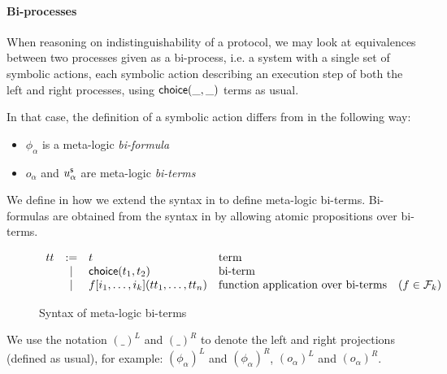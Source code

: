 \paragraph{Bi-processes}

When reasoning on indistinguishability of a protocol, we may look at equivalences
between two processes given as a bi-process, i.e. a system with a single set of
symbolic actions, each symbolic action describing an execution step of both the
left and right processes, using $\mathsf{choice}(\_,\_)$ terms as usual.

In that case, the definition of a symbolic action differs from 
in the following way:
\begin{itemize}
  \item $\phi_{\alpha}$ is a meta-logic \emph{bi-formula}
  \item $o_{\alpha}$ and $u_{\alpha}^{\textsf{s}}$ are meta-logic \emph{bi-terms}
\end{itemize}

We define in  how we extend the syntax in 
to define meta-logic bi-terms.
Bi-formulas are obtained from the syntax in  by allowing
atomic propositions over bi-terms.

\begin{figure}[h]
  \[
  \begin{array}{rclll}
    tt  & := & t &\text{term} & \\
        & \mid & \mathsf{choice}(t_1,t_2) &\text{bi-term} & \\
        & \mid & f[i_1,\ldots,i_k](tt_1,\dots,tt_n) &\text{function application over bi-terms} & (f\in\mathcal{F}_k)\\
  \end{array}
  \]
  \caption{Syntax of meta-logic bi-terms}\label{fig:bi-terms}
\end{figure}

We use the notation $(\_)^L$ and $(\_)^R$ to denote the left and right projections
(defined as usual), for example: $(\phi_{\alpha})^L$ and $(\phi_{\alpha})^R$,
$(o_{\alpha})^L$ and $(o_{\alpha})^R$.


